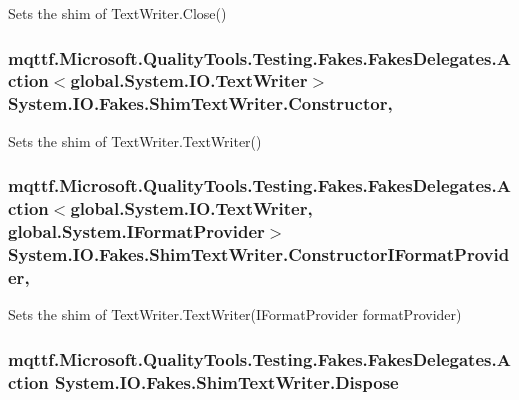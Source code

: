 Sets the shim of Text\-Writer.\-Close()

\hypertarget{class_system_1_1_i_o_1_1_fakes_1_1_shim_text_writer_a87630a745e00c3754fa35638ccb4f77b}{
\subsubsection[{Constructor}]{\setlength{\rightskip}{0pt plus 5cm}mqttf.\-Microsoft.\-Quality\-Tools.\-Testing.\-Fakes.\-Fakes\-Delegates.\-Action$<$global.\-System.\-I\-O.\-Text\-Writer$>$ System.\-I\-O.\-Fakes.\-Shim\-Text\-Writer.\-Constructor\hspace{0.3cm}{\ttfamily [static]}, {\ttfamily [set]}}}\label{class_system_1_1_i_o_1_1_fakes_1_1_shim_text_writer_a87630a745e00c3754fa35638ccb4f77b}


Sets the shim of Text\-Writer.\-Text\-Writer()

\hypertarget{class_system_1_1_i_o_1_1_fakes_1_1_shim_text_writer_a94b91d20895d96b27a7527c40c4d9d5b}{
\subsubsection[{Constructor\-I\-Format\-Provider}]{\setlength{\rightskip}{0pt plus 5cm}mqttf.\-Microsoft.\-Quality\-Tools.\-Testing.\-Fakes.\-Fakes\-Delegates.\-Action$<$global.\-System.\-I\-O.\-Text\-Writer, global.\-System.\-I\-Format\-Provider$>$ System.\-I\-O.\-Fakes.\-Shim\-Text\-Writer.\-Constructor\-I\-Format\-Provider\hspace{0.3cm}{\ttfamily [static]}, {\ttfamily [set]}}}\label{class_system_1_1_i_o_1_1_fakes_1_1_shim_text_writer_a94b91d20895d96b27a7527c40c4d9d5b}


Sets the shim of Text\-Writer.\-Text\-Writer(\-I\-Format\-Provider format\-Provider)

\hypertarget{class_system_1_1_i_o_1_1_fakes_1_1_shim_text_writer_ae6b51199dda80edef90c7da8e49eaec5}{
\subsubsection[{Dispose}]{\setlength{\rightskip}{0pt plus 5cm}mqttf.\-Microsoft.\-Quality\-Tools.\-Testing.\-Fakes.\-Fakes\-Delegates.\-Action System.\-I\-O.\-Fakes.\-Shim\-Text\-Writer.\-Dispose\hspace{0.3cm}{\ttfamily [set]}}}\label{class_system_1_1_i_o_1_1_fakes_1_1_shim_text_writer_ae6b51199dda80edef90c7da8e49eaec5}



